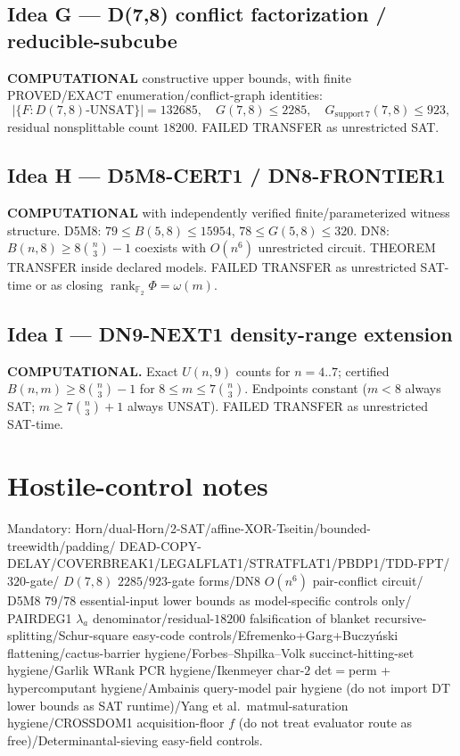 \documentclass[11pt]{article}
\begin{document}
\subsection*{Idea G --- D(7,8) conflict factorization / reducible-subcube}
\textbf{COMPUTATIONAL} constructive upper bounds, with finite PROVED/EXACT
enumeration/conflict-graph identities:
\[
|\{F:D(7,8)\text{-UNSAT}\}|=132685,\quad
G(7,8)\le 2285,\quad
G_{\mathrm{support}\,7}(7,8)\le 923,
\]
residual nonsplittable count $18200$. FAILED TRANSFER as unrestricted SAT.

\subsection*{Idea H --- D5M8-CERT1 / DN8-FRONTIER1}
\textbf{COMPUTATIONAL} with independently verified finite/parameterized witness
structure. D5M8: $79\le B(5,8)\le 15954$, $78\le G(5,8)\le 320$.
DN8: $B(n,8)\ge 8\binom{n}{3}-1$ coexists with $O(n^6)$ unrestricted circuit.
THEOREM TRANSFER inside declared models. FAILED TRANSFER as unrestricted
SAT-time or as closing $\operatorname{rank}_{\mathbb F_2}\Phi=\omega(m)$.

\subsection*{Idea I --- DN9-NEXT1 density-range extension}
\textbf{COMPUTATIONAL.} Exact $U(n,9)$ counts for $n=4..7$; certified
$B(n,m)\ge 8\binom{n}{3}-1$ for $8\le m\le 7\binom{n}{3}$. Endpoints constant
($m<8$ always SAT; $m\ge 7\binom{n}{3}+1$ always UNSAT). FAILED TRANSFER as
unrestricted SAT-time.

\section*{Hostile-control notes}
Mandatory: Horn/dual-Horn/2-SAT/affine-XOR-Tseitin/bounded-treewidth/padding/
DEAD-COPY-DELAY/COVERBREAK1/LEGALFLAT1/STRATFLAT1/PBDP1/TDD-FPT/$320$-gate/
$D(7,8)$ $2285$/$923$-gate forms/DN8 $O(n^6)$ pair-conflict circuit/
D5M8 $79$/$78$ essential-input lower bounds as model-specific controls only/
PAIRDEG1 $\lambda_a$ denominator/residual-$18200$ falsification of blanket
recursive-splitting/Schur-square easy-code controls/Efremenko+Garg+Buczy\'nski
flattening/cactus-barrier hygiene/Forbes--Shpilka--Volk succinct-hitting-set
hygiene/Garlik WRank PCR hygiene/Ikenmeyer char-$2$ det$=$perm + hypercomputant
hygiene/Ambainis query-model pair hygiene (do not import DT lower bounds as SAT
runtime)/Yang et al.\ matmul-saturation hygiene/CROSSDOM1 acquisition-floor $f$
(do not treat evaluator route as free)/Determinantal-sieving easy-field controls.
\end{document}
